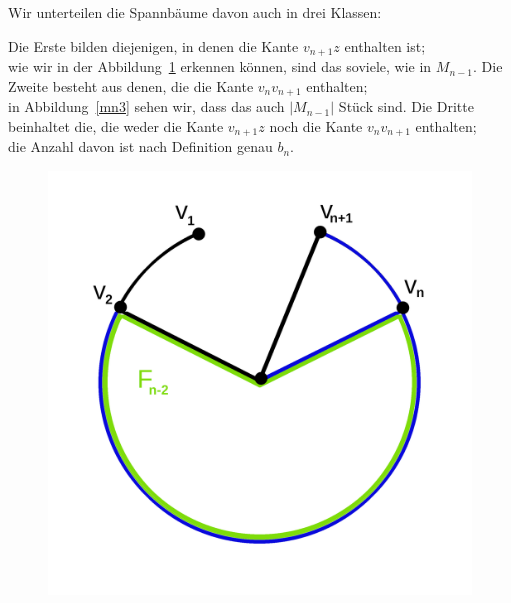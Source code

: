 Wir unterteilen die Spannbäume davon auch in drei Klassen:\\
\par
\begingroup
\leftskip=20pt
\rightskip=20pt
\noindent
Die Erste bilden diejenigen, in denen die Kante $v_{n+1}z$ enthalten ist;\\
wie wir in der Abbildung~\ref{mn2} erkennen können, sind das soviele, wie in $M_{n-1}$.
\vfill
Die Zweite besteht aus denen, die die Kante $v_nv_{n+1}$ enthalten;\\
in Abbildung~\ref{mn3} sehen wir, dass das auch $|M_{n-1}|$ Stück sind.
\vfill
Die Dritte beinhaltet die, die weder die Kante $v_{n+1}z$ noch die Kante $v_nv_{n+1}$ enthalten;\\ die Anzahl davon ist nach Definition genau $b_{n}$.
\par
\endgroup
\begin{figure}[H]
    \centering
    \begin{minipage}{0.45\textwidth}
        \centering
        \includegraphics[width=1\textwidth]{mn2.png}
        \caption{}
 \label{mn2} %
    \end{minipage}\hfill
    \begin{minipage}{0.45\textwidth}
        \centering

\end{minipage}
\end{figure}

